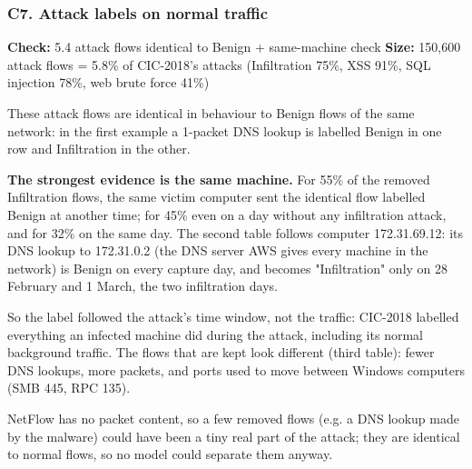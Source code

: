 \documentclass[10pt,a4paper]{article}
\newcommand{\meta}[2]{{\small\color{muted}\textbf{Check:} #1 \quad\textbar\quad \textbf{Size:} #2}}
\newenvironment{problem}{\par\noindent\begin{minipage}{\linewidth}\setlength{\parskip}{4pt}}{\end{minipage}\par\bigskip}
\begin{document}
\begin{problem}
\subsubsection*{C7. Attack labels on normal traffic}
\meta{5.4 attack flows identical to Benign + same-machine check}{150,600 attack flows = 5.8\% of CIC-2018's attacks (Infiltration 75\%, XSS 91\%, SQL injection 78\%, web brute force 41\%)}

These attack flows are identical in behaviour to Benign flows of the same network: in the first example a 1-packet DNS lookup is labelled Benign in one row and Infiltration in the other.

\textbf{The strongest evidence is the same machine.} For 55\% of the removed Infiltration flows, the same victim computer sent the identical flow labelled Benign at another time; for 45\% even on a day without any infiltration attack, and for 32\% on the same day. The second table follows computer 172.31.69.12: its DNS lookup to 172.31.0.2 (the DNS server AWS gives every machine in the network) is Benign on every capture day, and becomes "Infiltration" only on 28 February and 1 March, the two infiltration days.

So the label followed the attack's time window, not the traffic: CIC-2018 labelled everything an infected machine did during the attack, including its normal background traffic. The flows that are kept look different (third table): fewer DNS lookups, more packets, and ports used to move between Windows computers (SMB 445, RPC 135).

NetFlow has no packet content, so a few removed flows (e.g. a DNS lookup made by the malware) could have been a tiny real part of the attack; they are identical to normal flows, so no model could separate them anyway.


\end{problem}
\end{document}
